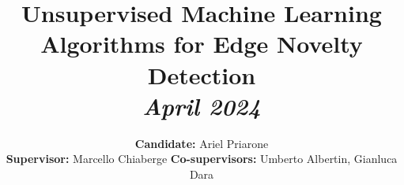 \documentclass[a4paper, 10pt, conference]{ieeeconf}      %
\title{{\LARGE \bf
Unsupervised Machine Learning Algorithms for Edge Novelty Detection} \\ \normalsize \vspace*{5pt} \textit{April 2024}
}
\author{\textbf{Candidate:} Ariel Priarone \\
\textbf{Supervisor:} Marcello Chiaberge 
\textbf{Co-supervisors:} Umberto Albertin, Gianluca Dara%
}
\date{\vspace{-\baselineskip}}
\begin{document}
\maketitle
\thispagestyle{empty}
\pagestyle{empty}

\begin{abstract}

\end{abstract}






\end{document}
